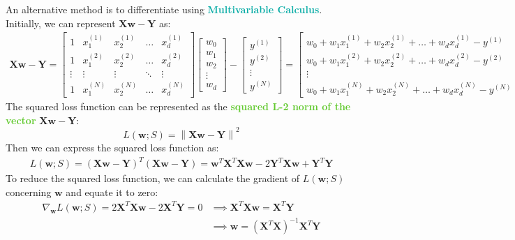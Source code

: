 \documentclass[twoside]{article}
\newcommand{\highlightbluetext}[1]{\textcolor[HTML]{09ACA6}{\textbf{#1}}}
\newcommand{\highlightgreentext}[1]{\textcolor[HTML]{62C92F}{\textbf{#1}}}
\numberwithin{equation}{section}
\begin{document}
	\newpage
	An alternative method is to differentiate using \highlightbluetext{Multivariable Calculus}. Initially, we can represent $\mathbf{Xw} - \mathbf{Y}$ as:
	\begin{align*}
		\mathbf{Xw} - \mathbf{Y} = \begin{bmatrix}
			1 & x_1^{(1)} & x_2^{(1)} & \ldots & x_d^{(1)} \\
			1 & x_1^{(2)} & x_2^{(2)} & \ldots & x_d^{(2)} \\
			\vdots & \vdots & \vdots & \ddots & \vdots \\
			1 & x_1^{(N)} & x_2^{(N)} & \ldots & x_d^{(N)} 
		\end{bmatrix} \begin{bmatrix} w_0 \\ w_1 \\ w_2 \\ \vdots \\ w_d \end{bmatrix} - \begin{bmatrix}
			y^{(1)} \\ y^{(2)} \\ \vdots \\ y^{(N)}
		\end{bmatrix} = \begin{bmatrix}
			w_0 + w_1 x_1^{(1)} + w_2 x_2^{(1)} + \ldots + w_d x_d^{(1)} - y^{(1)} \\
			w_0 + w_1 x_1^{(2)} + w_2 x_2^{(2)} + \ldots + w_d x_d^{(2)} - y^{(2)} \\
			\vdots \\
			w_0 + w_1 x_1^{(N)} + w_2 x_2^{(N)} + \ldots + w_d x_d^{(N)} - y^{(N)}
		\end{bmatrix}
	\end{align*}
	The squared loss function can be represented as the \highlightgreentext{squared L-2 norm of the vector} $\mathbf{Xw} - \mathbf{Y}$:
	\begin{equation}
	\label{eq:MultiOutputRegressionSquaredLossFunction}
	\boxed{L(\mathbf{w}; S) = \left\| \mathbf{Xw} - \mathbf{Y} \right\|^2}
	\end{equation}
	Then we can express the squared loss function as:
	\begin{align*}
		L(\mathbf{w}; S) = \left( \mathbf{Xw} - \mathbf{Y} \right)^T \left( \mathbf{Xw} - \mathbf{Y} \right) = \mathbf{w}^T \mathbf{X}^T \mathbf{X} \mathbf{w} - 2 \mathbf{Y}^T \mathbf{X} \mathbf{w} + \mathbf{Y}^T \mathbf{Y}
	\end{align*}
	To reduce the squared loss function, we can calculate the gradient of $L(\mathbf{w}; S)$ concerning $\mathbf{w}$ and equate it to zero:
	\begin{align*}
		\nabla_{\mathbf{w}} L(\mathbf{w}; S) = 2 \mathbf{X}^T \mathbf{X} \mathbf{w} - 2 \mathbf{X}^T \mathbf{Y} = 0
		&\implies \mathbf{X}^T \mathbf{X} \mathbf{w} = \mathbf{X}^T \mathbf{Y} \\
		&\implies \mathbf{w} = \left( \mathbf{X}^T \mathbf{X} \right)^{-1} \mathbf{X}^T \mathbf{Y}
	\end{align*}
\end{document}
